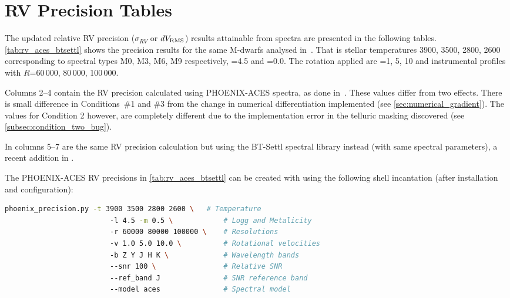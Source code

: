 
\chapter{{RV} Precision Tables} %
\label{appendix:nir_prec_amendment}
The updated relative {RV} precision ($\sigma_{RV}$ or $dV_{\textrm{RMS}}$) results attainable from \nir{} spectra are presented in the following tables.
\cref{tab:rv_aces_btsettl} shows the precision results for the same M-dwarfs analysed in~\citet{figueira_radial_2016}.
That is stellar temperatures 3900, 3500, 2800, 2600\K{} corresponding to spectral types {M0}, {M3}, {M6}, {M9} respectively, \Logg{}=4.5 and \feh{}=0.0.
The rotation applied are \Vsini{}=1, 5, 10\kmps{} and instrumental profiles with \(R\)=60\,000, 80\,000, 100\,000.

Columns 2--4 contain the {RV} precision calculated using {PHOENIX-ACES} spectra, as done in~\citet{figueira_radial_2016}.
These values differ from two effects.
There is small difference in Conditions~\#1 and \#3 from the change in numerical differentiation implemented (see \cref{sec:numerical_gradient}).
The values for Condition 2 however, are completely different due to the implementation error in the telluric masking discovered (see \cref{subsec:condition_two_bug}).

In columns 5--7 are the same {RV} precision calculation but using the {BT-Settl} spectral library instead (with same spectral parameters), a recent addition in \eniric{}.

The {PHOENIX-ACES} {RV} precisions in \cref{tab:rv_aces_btsettl} can be created with \eniric{} using the following shell incantation (after installation and configuration):
\begin{lstlisting}[language={bash},caption={Command line incantation to calculate the {PHOENIX-ACES} {RV} precisions; with comments.},label={lst:commandline_incantation}]
    phoenix_precision.py -t 3900 3500 2800 2600 \   # Temperature
                         -l 4.5 -m 0.5 \            # Logg and Metalicity
                         -r 60000 80000 100000 \    # Resolutions
                         -v 1.0 5.0 10.0 \          # Rotational velocities
                         -b Z Y J H K \             # Wavelength bands
                         --snr 100 \                # Relative SNR
                         --ref_band J               # SNR reference band
                         --model aces               # Spectral model
\end{lstlisting}

